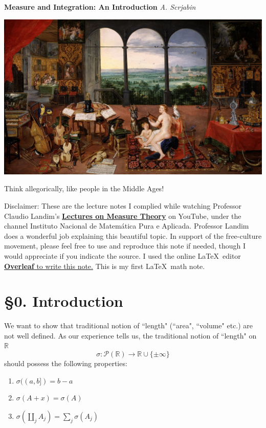 \documentclass[hidelinks]{article}
\theoremstyle{definition}
\theoremstyle{dotless}
\theoremstyle{remark}
\begin{document}
\begin{titlepage}
   \begin{center}
      \LARGE\textbf{Measure and Integration: An Introduction}\medbreak
      \Large\textsl{A. Scrjabin}\bigbreak
      \centerline{\href{https://en.wikipedia.org/wiki/The_Five_Senses_(series)}{\includegraphics[width=0.6\linewidth]{ee.jpg}}}
      \normalsize{Think allegorically, like people in the Middle Ages!}
      \end{center}
  \tableofcontents
   \bigbreak\bigbreak
   Disclaimer: These are the lecture notes I complied while watching Professor Claudio Landim's \href{https://www.youtube.com/playlist?list=PLo4jXE-LdDTQq8ZyA8F8reSQHej3F6RFX}{\textbf{Lectures on Measure Theory}} on YouTube, under the channel Instituto Nacional de Matemática Pura e Aplicada. Professor Landim does a wonderful job explaining this beautiful topic. In support of the free-culture movement, please feel free to use and reproduce this note if needed, though I would appreciate if you indicate the source. I used the online \LaTeX\  editor \href{https://www.overleaf.com}{\textbf{Overleaf} to write this note.} This is my first \LaTeX\ math note.
\end{titlepage}

\section*{\S0. Introduction}
\setcounter{section}{0}

We want to show that traditional notion of ``length" (``area", ``volume" etc.) are not well defined. \bigbreak
As our experience tells us, the traditional notion of ``length" on $\mathbb{R}$
\[
\sigma: \mathscr{P}(\mathbb{R})\to \mathbb{R}\cup\{\pm\infty\}
\]
should possess the following properties:
\begin{enumerate}[label=\arabic*\degree]
    \item $\sigma((a,b])=b-a$
    \item $\sigma(A+x)=\sigma(A)$
    \item $\sigma(\coprod\limits_jA_j)=\sum\limits_j\sigma(A_j)$
\end{enumerate}
\end{document}
